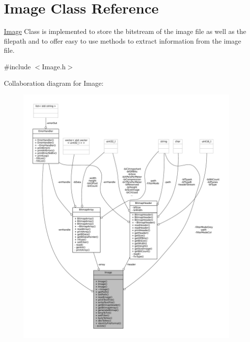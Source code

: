 \hypertarget{classImage}{}\section{Image Class Reference}
\label{classImage}


\mbox{\hyperlink{classImage}{Image}} Class is implemented to store the bitstream of the image file as well as the filepath and to offer easy to use methods to extract information from the image file.  




{\ttfamily \#include $<$Image.\+h$>$}



Collaboration diagram for Image\+:
\nopagebreak
\begin{figure}[H]
\begin{center}
\leavevmode
\includegraphics[width=350pt]{classImage__coll__graph}
\end{center}
\end{figure}
